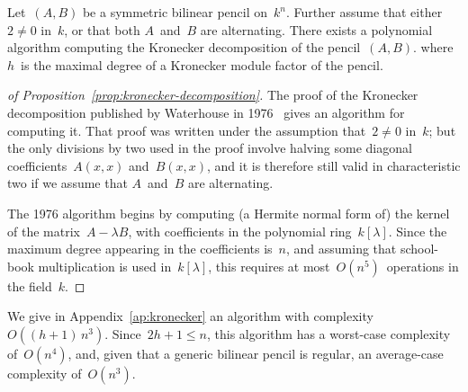\documentclass{lms}
\begin{document}
\begin{prop}\label{prop:kronecker-decomposition}
Let~$(A, B)$ be a symmetric bilinear pencil on~$k^n$.
Further assume that either~$2 ≠ 0$ in~$k$,
or that both $A$~and~$B$ are alternating.
There exists a polynomial algorithm computing the Kronecker decomposition
of the pencil~$(A, B)$.
where $h$~is the maximal degree of a Kronecker module factor of the pencil.
\end{prop}
\begin{proof}[of Proposition~\ref{prop:kronecker-decomposition}]
The proof of the Kronecker decomposition published
by Waterhouse in 1976~\cite[Theorem 3.1]{inventiones1976waterhouse}
gives an algorithm for computing it.
That proof was written under the assumption that~$2 ≠ 0$ in~$k$;
but the only divisions by two used in the proof
involve halving some diagonal coefficients~$A(x,x)$ and~$B(x,x)$,
and it is therefore still valid in characteristic two
if we assume that $A$~and~$B$ are alternating.

The 1976 algorithm begins by computing (a Hermite normal form of)
the kernel of the matrix~$A - λ B$,
with coefficients in the polynomial ring~$k[λ]$.
Since the maximum degree appearing in the coefficients is~$n$,
and assuming that school-book multiplication is used in~$k[λ]$,
this requires at most~$O(n^5)$~operations in the field~$k$.
\end{proof}

We give in Appendix~\ref{ap:kronecker} an algorithm
with complexity~$O((h+1)\,n^3)$.
Since~$2h+1 ≤ n$, this algorithm has a worst-case complexity of~$O(n^4)$,
and, given that a generic bilinear pencil is regular,
an average-case complexity of~$O(n^3)$.
\end{document}
